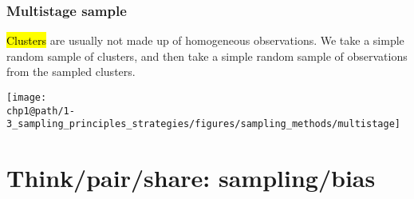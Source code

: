 \documentclass[slidestop,compress,mathserif]{beamer}
\makeatletter
\def\chp1@path{../../Chp 1}
\makeatother
\begin{document}

\begin{frame}
	\frametitle{Multistage sample}

	\hl{Clusters} are usually not made up of homogeneous observations.  We take a simple random sample of clusters, and then take a simple random sample of observations from the sampled clusters.

	\begin{center}
	\texttt{[image: \\chp1@path/1-3\_sampling\_principles\_strategies/figures/sampling\_methods/multistage]}
	\end{center}

\end{frame}






\section{Think/pair/share: sampling/bias}

\end{document}
